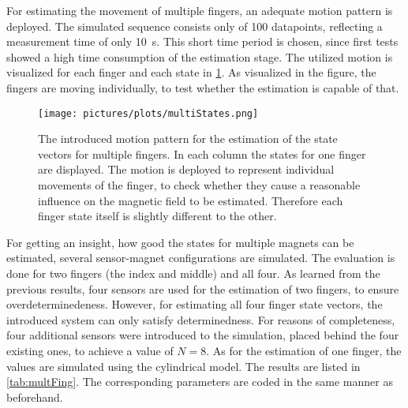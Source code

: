 \FloatBarrier
For estimating the movement of multiple fingers, an adequate motion pattern is deployed. The simulated sequence consists only of 100 datapoints, reflecting a measurement time of only \SI{10}{\second}. This short time period is chosen, since first tests showed a high time consumption of the estimation stage. The utilized motion is visualized for each finger and each state in \ref{fig:multiFing}. As visualized in the figure, the fingers are moving individually, to test whether the estimation is capable of that.\\
\begin{figure}[!htb]
\centering
\texttt{[image: pictures/plots/multiStates.png]}
\caption[Introduced movement pattern for four finger estimation]
{The introduced motion pattern for the estimation of the state vectors for multiple fingers. In each column the states for one finger are displayed. The motion is deployed to represent individual movements of the finger, to check whether they cause a reasonable influence on the magnetic field to be estimated. Therefore each finger state itself is slightly different to the other.}
\label{fig:multiFing}
\end{figure}
For getting an insight, how good the states for multiple magnets can be estimated, several sensor-magnet configurations are simulated. The evaluation is done for two fingers (the index and middle) and all four. As learned from the previous results, four sensors are used for the estimation of two fingers, to ensure overdeterminedeness. However, for estimating all four finger state vectors, the introduced system can only satisfy determinedness. For reasons of completeness, four additional sensors were introduced to the simulation, placed behind the four existing ones, to achieve a value of $ N = 8 $. As for the estimation of one finger, the values are simulated using the cylindrical model. The results are listed in \ref{tab:multFing}. The corresponding parameters are coded in the same manner as beforehand.\\
